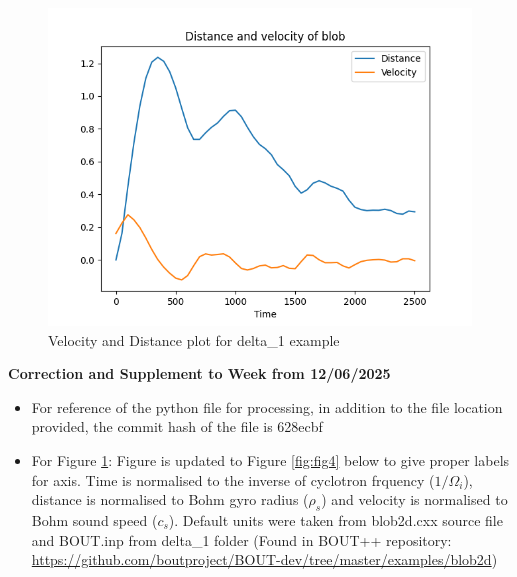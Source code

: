 \documentclass{article}
\begin{document}
\begin{arrowlist}
    \begin{figure}[H]
    \centering
        \includegraphics[height=0.5\textheight]{./Fig/Fig3 vel plot.png}
        \normalsize{\caption{Velocity and Distance plot for delta\_1 example}
        \label{fig:fig3}}
    \end{figure}   

    \item \textbf{Correction and Supplement to Week from 12/06/2025}
    \begin{itemize}
        \item For reference of the python file for processing, in addition to the file location provided, the commit hash of the file is 628ecbf
        \item For Figure \ref{fig:fig3}: Figure is updated to Figure \ref{fig:fig4} below to give proper labels for axis. Time is normalised to the inverse of cyclotron frquency ($1/\Omega_i$), distance is normalised to Bohm gyro radius ($\rho_s$) and velocity is normalised to Bohm sound speed ($c_s$). Default units were taken from blob2d.cxx source file and BOUT.inp from delta\_1 folder (Found in BOUT++ repository: \url{https://github.com/boutproject/BOUT-dev/tree/master/examples/blob2d}) 
    \end{itemize}


\end{arrowlist}
\end{document}

